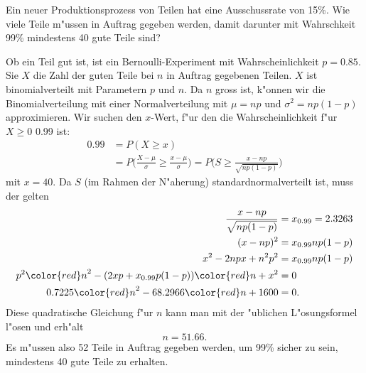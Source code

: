 Ein neuer Produktionsprozess von Teilen hat eine Ausschussrate von 15\%.
Wie viele Teile m"ussen in Auftrag gegeben werden, damit darunter
mit Wahrschkeit 99\% mindestens 40 gute Teile sind?



\begin{loesung}
Ob ein Teil gut ist, ist ein Bernoulli-Experiment mit Wahrscheinlichkeit
$p=0.85$.
Sie $X$ die Zahl der guten Teile bei $n$ in Auftrag gegebenen Teilen.
$X$ ist binomialverteilt mit Parametern $p$ und $n$.
Da $n$ gross ist, k"onnen wir die Binomialverteilung mit einer
Normalverteilung mit $\mu=np$ und $\sigma^2=np(1-p)$ approximieren.
Wir suchen den $x$-Wert, f"ur den die Wahrscheinlichkeit f"ur $X\ge 0$
0.99 ist:
\begin{align*}
0.99
&=
P(X\ge x)\\
&=
P\biggl(\frac{X-\mu}{\sigma}\ge \frac{x-\mu}{\sigma}\biggr)
=
P\biggl(S\ge \frac{x-np}{\sqrt{np(1-p)}}\biggr)
\end{align*}
mit $x=40$.
Da $S$ (im Rahmen der N"aherung) standardnormalverteilt ist, muss der
gelten
\begin{align*}
\frac{x-np}{\sqrt{np(1-p)}}
&=
x_{0.99}=2.3263
\\
(x-np)^2
&=
x_{0.99}np(1-p)
\\
x^2-2npx+n^2p^2
&=
x_{0.99}np(1-p)
\\
p^2{\color{red}n}^2
-
(2xp+x_{0.99}p(1-p)) {\color{red}n}
+
x^2
&=0
\\
0.7225 {\color{red}n}^2 -68.2966 {\color{red}n} + 1600
&= 
0.
\end{align*}
Diese quadratische Gleichung f"ur $n$ kann man mit der "ublichen
L"osungsformel l"osen und erh"alt
\[
n=51.66.
\]
Es m"ussen also 52 Teile in Auftrag gegeben werden, um 99\% sicher zu sein,
mindestens 40 gute Teile zu erhalten.
\end{loesung}

\begin{bewertung}
\end{bewertung}
